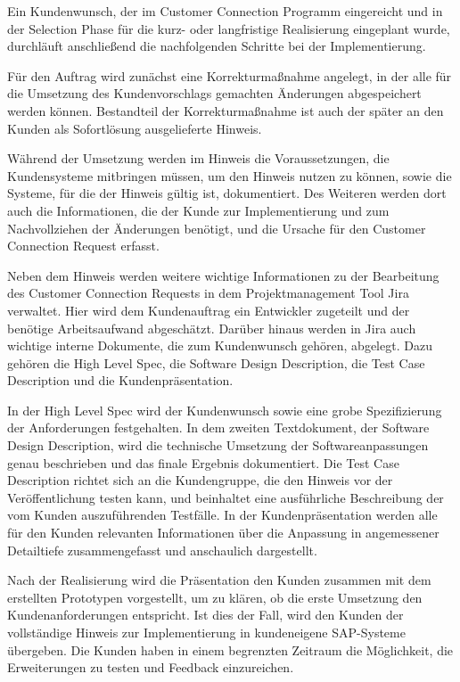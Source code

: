 Ein Kundenwunsch, der im Customer Connection Programm eingereicht und in der Selection Phase für die kurz- oder langfristige Realisierung eingeplant wurde, durchläuft anschließend die nachfolgenden Schritte bei der Implementierung.

Für den Auftrag wird zunächst eine Korrekturmaßnahme angelegt, in der alle für die Umsetzung des Kundenvorschlags gemachten Änderungen abgespeichert werden können. Bestandteil der Korrekturmaßnahme ist auch der später an den Kunden als Sofortlösung ausgelieferte Hinweis.

Während der Umsetzung werden im Hinweis die Voraussetzungen, die Kundensysteme mitbringen müssen, um den Hinweis nutzen zu können, sowie die Systeme, für die der Hinweis gültig ist, dokumentiert. Des Weiteren werden dort auch die Informationen, die der Kunde zur Implementierung und zum Nachvollziehen der Änderungen benötigt, und die Ursache für den Customer Connection Request erfasst.

Neben dem Hinweis werden weitere wichtige Informationen zu der Bearbeitung des Customer Connection Requests in dem Projektmanagement Tool Jira verwaltet. Hier wird dem Kundenauftrag ein Entwickler zugeteilt und der benötige Arbeitsaufwand abgeschätzt. Darüber hinaus werden in Jira auch wichtige interne Dokumente, die zum Kundenwunsch gehören, abgelegt. Dazu gehören die High Level Spec, die Software Design Description, die Test Case Description und die Kundenpräsentation.

In der High Level Spec wird der Kundenwunsch sowie eine grobe Spezifizierung der Anforderungen festgehalten. In dem zweiten Textdokument, der Software Design Description, wird die technische Umsetzung der Softwareanpassungen genau beschrieben und das finale Ergebnis dokumentiert. Die Test Case Description richtet sich an die Kundengruppe, die den Hinweis vor der Veröffentlichung testen kann, und beinhaltet eine ausführliche Beschreibung der vom Kunden auszuführenden Testfälle. In der Kundenpräsentation werden alle für den Kunden relevanten Informationen über die Anpassung in angemessener Detailtiefe zusammengefasst und anschaulich dargestellt.

Nach der Realisierung wird die Präsentation den Kunden zusammen mit dem erstellten Prototypen vorgestellt, um zu klären, ob die erste Umsetzung den Kundenanforderungen entspricht. Ist dies der Fall, wird den Kunden der vollständige Hinweis zur Implementierung in kundeneigene SAP-Systeme übergeben. Die Kunden haben in einem begrenzten Zeitraum die Möglichkeit, die Erweiterungen zu testen und Feedback einzureichen.

